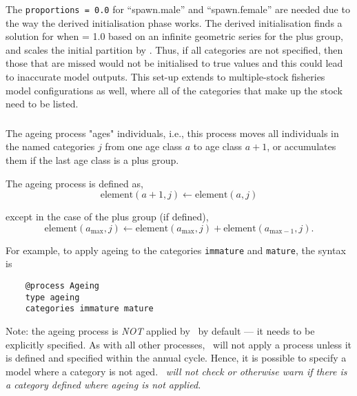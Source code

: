 The \texttt{proportions = 0.0} for \enquote{spawn.male} and \enquote{spawn.female} are needed due to the way the derived initialisation phase works. The derived initialisation finds a solution for when  = 1.0 based on an infinite geometric series for the plus group, and scales the initial partition by . Thus, if all categories are not specified, then those that are missed would not be initialised to true values and this could lead to inaccurate model outputs. This set-up extends to multiple-stock fisheries model configurations as well, where all of the categories that make up the stock need to be listed.

\subsubsection{\label{sec:Process-Ageing}}

The ageing process "ages" individuals, i.e., this process moves all individuals in the named categories $j$ from one age class $a$ to age class $a + 1$, or accumulates them if the last age class is a plus group.

The ageing process is defined as,
\begin{equation}
  \text{element}(a + 1,j) \leftarrow \text{element}(a,j)
\end{equation}

except in the case of the plus group (if defined),
\begin{equation}
  \text{element}(a_{\text{max}}, j) \leftarrow \text{element}(a_{\text{max}}, j) + \text{element}(a_{\text{max}-1}, j).
\end{equation}

For example, to apply ageing to the categories \texttt{immature} and \texttt{mature}, the syntax is

{\small{\begin{verbatim}
	@process Ageing
	type ageing
	categories immature mature
	\end{verbatim}}}

Note: the ageing process is \emph{NOT} applied by \CNAME\ by default --- it needs to be explicitly specified. As with all other processes, \CNAME\ will not apply a process unless it is defined and specified within the annual cycle. Hence, it is possible to specify a model where a category is not aged. \emph{\CNAME\ will not check or otherwise warn if there is a category defined where ageing is not applied.}

\subsubsection{\label{sec:Process-Mortality}}

